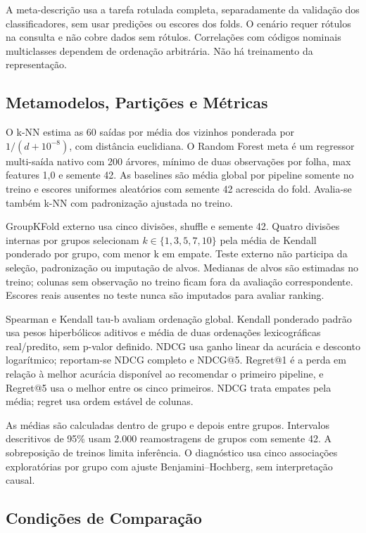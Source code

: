 \documentclass[kdmile,a4paper]{kdmile} %
\begin{document}
A meta-descrição usa a tarefa rotulada completa, separadamente da validação dos classificadores, sem usar predições ou escores dos folds. O cenário requer rótulos na consulta e não cobre dados sem rótulos. Correlações com códigos nominais multiclasses dependem de ordenação arbitrária. Não há treinamento da representação.

\subsection{Metamodelos, Partições e Métricas}

O k-NN estima as 60 saídas por média dos vizinhos ponderada por $1/(d+10^{-8})$, com distância euclidiana. O Random Forest meta é um regressor multi-saída nativo com 200 árvores, mínimo de duas observações por folha, max features 1,0 e semente 42. As baselines são média global por pipeline somente no treino e escores uniformes aleatórios com semente 42 acrescida do fold. Avalia-se também k-NN com padronização ajustada no treino.

GroupKFold externo usa cinco divisões, shuffle e semente 42. Quatro divisões internas por grupos selecionam $k\in\{1,3,5,7,10\}$ pela média de Kendall ponderado por grupo, com menor k em empate. Teste externo não participa da seleção, padronização ou imputação de alvos. Medianas de alvos são estimadas no treino; colunas sem observação no treino ficam fora da avaliação correspondente. Escores reais ausentes no teste nunca são imputados para avaliar ranking.

Spearman e Kendall tau-b avaliam ordenação global. Kendall ponderado padrão usa pesos hiperbólicos aditivos e média de duas ordenações lexicográficas real/predito, sem p-valor definido. NDCG usa ganho linear da acurácia e desconto logarítmico; reportam-se NDCG completo e NDCG@5. Regret@1 é a perda em relação à melhor acurácia disponível ao recomendar o primeiro pipeline, e Regret@5 usa o melhor entre os cinco primeiros. NDCG trata empates pela média; regret usa ordem estável de colunas.

As médias são calculadas dentro de grupo e depois entre grupos. Intervalos descritivos de 95\% usam 2.000 reamostragens de grupos com semente 42. A sobreposição de treinos limita inferência. O diagnóstico usa cinco associações exploratórias por grupo com ajuste Benjamini--Hochberg, sem interpretação causal.

\subsection{Condições de Comparação}
\end{document}
